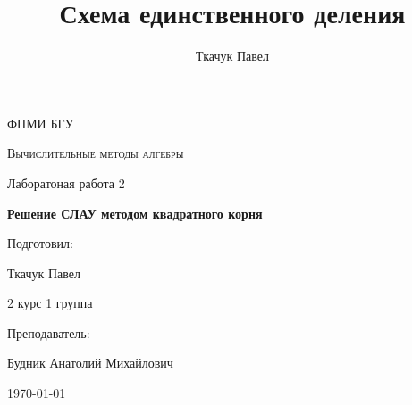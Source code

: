 \documentclass[11.4pt]{article}
\author{Ткачук Павел}
\title{Схема единственного деления}
\begin{document}
	\begin{titlepage}
		
		\centering
		{\scshape\LARGE ФПМИ БГУ \par}
		\vfill
		\begin{flushleft}
		{\scshape\Large Вычислительные методы алгебры\par Лаборатоная работа 2 \par}
		\vspace{1cm}
		{\huge\bfseries Решение СЛАУ методом квадратного корня\par}
		\end{flushleft}
		\vspace{10cm}
		\begin{flushright}
		\large
		Подготовил:\par
		Ткачук Павел\par
		2 курс 1 группа\par
		\vspace{0.5cm}
		Преподаватель:\par
		Будник Анатолий Михайлович
		\end{flushright}
		
		\vfill
		{\large \today}
	\end{titlepage}
\end{document}
